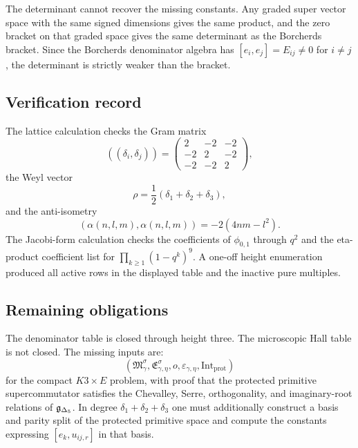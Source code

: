 The determinant cannot recover the missing constants.  Any graded super
vector space with the same signed dimensions gives the same product, and
the zero bracket on that graded space gives the same determinant as the
Borcherds bracket.  Since the Borcherds denominator algebra has
\([e_i,e_j]=E_{ij}\neq0\) for \(i\neq j\), the determinant is strictly
weaker than the bracket.

\subsection{Verification record}

The lattice calculation checks the Gram matrix
$$
((\delta_i,\delta_j))=
\begin{pmatrix}
2&-2&-2\\
-2&2&-2\\
-2&-2&2
\end{pmatrix},
$$
the Weyl vector
$$
\rho=\frac12(\delta_1+\delta_2+\delta_3),
$$
and the anti-isometry
$$
(\alpha(n,l,m),\alpha(n,l,m))=-2(4nm-l^2).
$$
The Jacobi-form calculation checks the coefficients of \(\phi_{0,1}\)
through \(q^2\) and the eta-product coefficient list for
\(\prod_{k\geq1}(1-q^k)^9\).  A one-off height enumeration produced all
active rows in the displayed table and the inactive pure multiples.

\subsection{Remaining obligations}

The denominator table is closed through height three.  The microscopic
Hall table is not closed.  The missing inputs are:
$$
(\mathfrak M_\gamma^\sigma,\mathfrak E_{\gamma,\eta}^\sigma,
o,\varepsilon_{\gamma,\eta},\mathrm{Int}_{\mathrm{prot}})
$$
for the compact \(K3\times E\) problem, with proof that the protected
primitive supercommutator satisfies the Chevalley, Serre,
orthogonality, and imaginary-root relations of \(\mathfrak g_{\Delta_5}\).  In degree
\(\delta_1+\delta_2+\delta_3\) one must additionally construct a basis
and parity split of the protected primitive space and compute the
constants expressing \([e_k,u_{ij,r}]\) in that basis.
